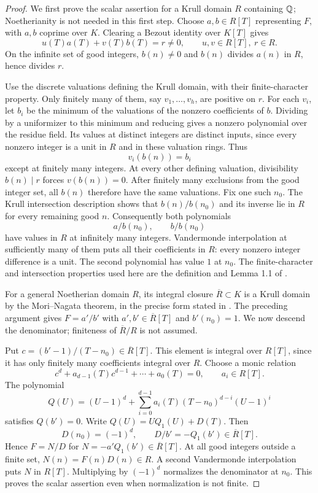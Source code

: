 \begin{proof}
We first prove the scalar assertion for a Krull domain $R$ containing
$\mathbb Q$; Noetherianity is not needed in this first step. Choose
$a,b\in R[T]$ representing $F$, with $a,b$ coprime over $K$.
Clearing a Bezout identity over $K[T]$ gives
\[
              u(T)a(T)+v(T)b(T)=r\ne0,
              \qquad u,v\in R[T],\ r\in R.
\]
On the infinite set of good integers, $b(n)\ne0$ and
$b(n)$ divides $a(n)$ in $R$, hence divides $r$.

Use the discrete valuations defining the Krull domain, with their
finite-character property. Only finitely many of them, say
$v_1,\ldots,v_h$, are positive on $r$. For each $v_i$, let $b_i$
be the minimum of the valuations of the nonzero coefficients of
$b$. Dividing by a uniformizer to this minimum and reducing gives
a nonzero polynomial over the residue field. Its values at
distinct integers are distinct inputs, since every nonzero
integer is a unit in $R$ and in these valuation rings. Thus
\[
                       v_i(b(n))=b_i
\]
except at finitely many integers. At every other defining
valuation, divisibility $b(n)\mid r$ forces $v(b(n))=0$.
After finitely many exclusions from the good integer set, all
$b(n)$ therefore have the same valuations. Fix one such $n_0$.
The Krull intersection description shows that
$b(n)/b(n_0)$ and its inverse lie in $R$ for every remaining
good $n$. Consequently both polynomials
\[
                        a/b(n_0),\qquad b/b(n_0)
\]
have values in $R$ at infinitely many integers. Vandermonde
interpolation at sufficiently many of them puts all their
coefficients in $R$: every nonzero integer difference is a unit.
The second polynomial has value $1$ at $n_0$.
The finite-character and intersection properties used here are
the definition and Lemma 1.1 of \citet[p.~998]{DS_Nagata1996}.

For a general Noetherian domain $R$, its integral closure
$\overline R\subset K$ is a Krull domain by the Mori--Nagata
theorem, in the precise form stated in
\citet[Lemma 1.2, p.~998]{DS_Nagata1996}. The preceding argument
gives $F=a'/b'$ with $a',b'\in\overline R[T]$ and
$b'(n_0)=1$. We now descend the denominator; finiteness of
$\overline R/R$ is not assumed.

Put $c=(b'-1)/(T-n_0)\in\overline R[T]$. This element is
integral over $R[T]$, since it has only finitely many coefficients
integral over $R$. Choose a monic relation
\[
 c^d+a_{d-1}(T)c^{d-1}+\cdots+a_0(T)=0,
                       \qquad a_i\in R[T].
\]
The polynomial
\[
 Q(U)=(U-1)^d+\sum_{i=0}^{d-1}
                   a_i(T)(T-n_0)^{d-i}(U-1)^i
\]
satisfies $Q(b')=0$. Write $Q(U)=UQ_1(U)+D(T)$. Then
\[
 D(n_0)=(-1)^d,\qquad D/b'=-Q_1(b')\in\overline R[T].
\]
Hence $F=N/D$ for $N=-a'Q_1(b')\in\overline R[T]$.
At all good integers outside a finite set,
$N(n)=F(n)D(n)\in R$. A second Vandermonde interpolation
puts $N$ in $R[T]$. Multiplying by $(-1)^d$ normalizes the
denominator at $n_0$. This proves the scalar assertion even
when normalization is not finite.


\end{proof}
